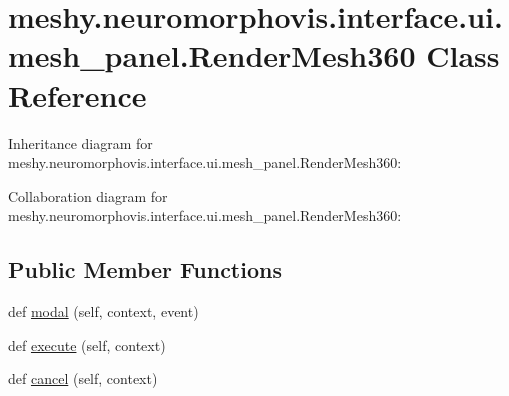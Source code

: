 \hypertarget{classmeshy_1_1neuromorphovis_1_1interface_1_1ui_1_1mesh__panel_1_1RenderMesh360}{}\section{meshy.\+neuromorphovis.\+interface.\+ui.\+mesh\+\_\+panel.\+Render\+Mesh360 Class Reference}
\label{classmeshy_1_1neuromorphovis_1_1interface_1_1ui_1_1mesh__panel_1_1RenderMesh360}


Inheritance diagram for meshy.\+neuromorphovis.\+interface.\+ui.\+mesh\+\_\+panel.\+Render\+Mesh360\+:


Collaboration diagram for meshy.\+neuromorphovis.\+interface.\+ui.\+mesh\+\_\+panel.\+Render\+Mesh360\+:
\subsection*{Public Member Functions}
\begin{DoxyCompactItemize}
\item 
def \hyperlink{classmeshy_1_1neuromorphovis_1_1interface_1_1ui_1_1mesh__panel_1_1RenderMesh360_aaff55eb4f06cab8dc82d9a2393ff9395}{modal} (self, context, event)
\item 
def \hyperlink{classmeshy_1_1neuromorphovis_1_1interface_1_1ui_1_1mesh__panel_1_1RenderMesh360_ad25d731225b65a602296ef96ba5f56f5}{execute} (self, context)
\item 
def \hyperlink{classmeshy_1_1neuromorphovis_1_1interface_1_1ui_1_1mesh__panel_1_1RenderMesh360_a2748ddb50e55484d28bb2b79d1414b1e}{cancel} (self, context)
\end{DoxyCompactItemize}
